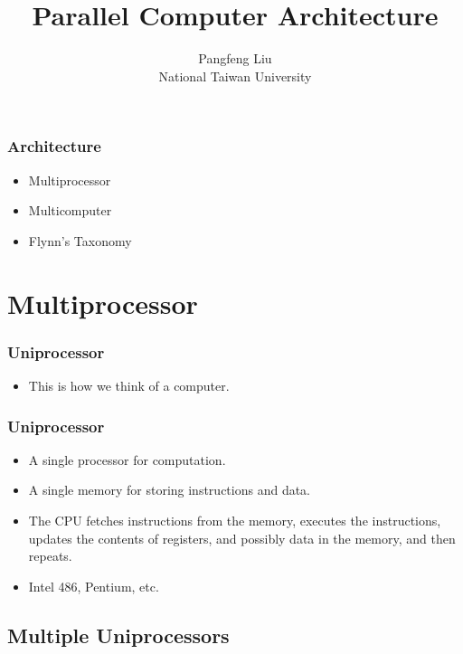 \documentclass{beamer}
\begin{document}
\begin{CJK}{UTF8}{bsmi}

\title{Parallel Computer Architecture}

\author{Pangfeng Liu \\ National Taiwan University}

\begin{frame}
\titlepage
\end{frame}


\begin{frame}
\frametitle{Architecture}
\begin{itemize}
\item Multiprocessor
\item Multicomputer
\item Flynn's Taxonomy
\end{itemize}
\end{frame}

\section{Multiprocessor}

\begin{frame}
\frametitle{Uniprocessor}
\centerline{}
\begin{itemize}
\item This is how we think of a computer.
\end{itemize}
\end{frame}

\begin{frame}
\frametitle{Uniprocessor}
\begin{itemize}
\item A single processor for computation.
\item A single memory for storing instructions and data.
\item The CPU fetches instructions from the memory, executes the
  instructions, updates the contents of registers, and possibly data in
  the memory, and then repeats.
\item Intel 486, Pentium, etc.
\end{itemize}
\end{frame}


\subsection{Multiple Uniprocessors}


\end{CJK}
\end{document}
